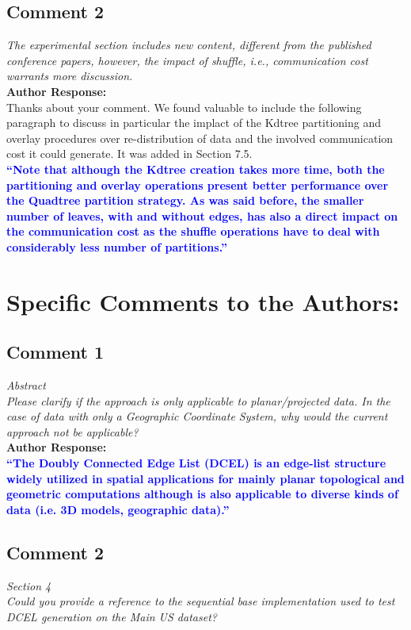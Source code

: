 \documentclass[10pt]{article}
\begin{document}
\subsection*{Comment 2}
\textit{
The experimental section includes new content, different from the published conference papers, however, the impact of shuffle, i.e., communication cost warrants more discussion.
} \\

\textbf{Author Response:}\\

Thanks about your comment.  We found valuable to include the following paragraph to discuss in particular the implact of the Kdtree partitioning and overlay procedures over re-distribution of data and the involved communication cost it could generate. It was added in Section 7.5.\\

\textbf{\textcolor{blue}{
``Note that although the Kdtree creation takes more time, both the partitioning and overlay operations present better performance over the Quadtree partition strategy.  As was said before, the smaller number of leaves, with and without edges, has also a direct impact on the communication cost as the shuffle operations have to deal with considerably less number of partitions.''
}}

\section*{Specific Comments to the Authors:}
\subsection*{Comment 1}
\textit{Abstract\\
Please clarify if the approach is only applicable to planar/projected data. In the case of data with only a Geographic Coordinate System, why would the current approach not be applicable?} \\

\textbf{Author Response:}\\

\textbf{\textcolor{blue}{
``The Doubly Connected Edge List (DCEL) is an edge-list structure widely utilized in spatial applications for mainly planar topological and geometric computations although is also applicable to diverse kinds of data (i.e. 3D models, geographic data).''
}}

\subsection*{Comment 2}
\textit{
Section 4 \\
Could you provide a reference to the sequential base implementation used to test DCEL generation on the Main US dataset?
} \\
\end{document}
